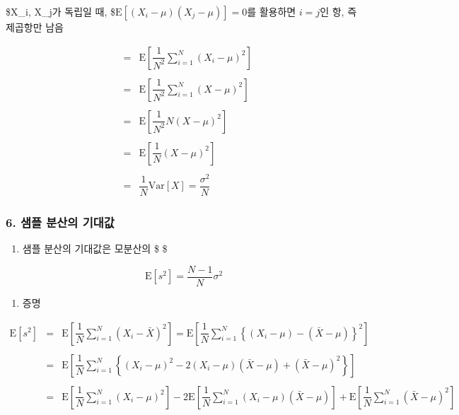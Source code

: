 \documentclass[11pt]{article}
\providecommand{\tightlist}{%
      \setlength{\itemsep}{0pt}\setlength{\parskip}{0pt}}
\begin{document}
    \$X\_i, X\_j가 독립일 때,
\$\(\text{E}\left[ (X_i-\mu)(X_j-\mu) \right] = 0\)를 활용하면 \(i=j\)인
항, 즉 제곱항만 남음

    \[ 
\begin{eqnarray}
&=& \text{E} \left[ \dfrac{1}{N^2} \sum_{i=1}^N (X_i - \mu)^2 \right] \\\\
&=& \text{E} \left[ \dfrac{1}{N^2} \sum_{i=1}^N (X - \mu)^2 \right] \\\\
&=& \text{E} \left[ \dfrac{1}{N^2} N (X - \mu)^2 \right] \\\\
&=& \text{E} \left[ \dfrac{1}{N} (X - \mu)^2 \right] \\\\
&=& \dfrac{1}{N} \text{Var}[X] = \dfrac{\sigma^2}{N}
\end{eqnarray}
\]

    \hypertarget{uxc0d8uxd50c-uxbd84uxc0b0uxc758-uxae30uxb300uxac12}{%
\subsubsection{6. 샘플 분산의
기대값}\label{uxc0d8uxd50c-uxbd84uxc0b0uxc758-uxae30uxb300uxac12}}

    \begin{enumerate}
\def\labelenumi{\arabic{enumi})}
\tightlist
\item
  샘플 분산의 기대값은 모분산의 \$ \$
\end{enumerate}

    \[\text{E}[s^2] = \dfrac{N-1}{N}\sigma^2\]

    \begin{enumerate}
\def\labelenumi{\arabic{enumi})}
\setcounter{enumi}{1}
\tightlist
\item
  증명
\end{enumerate}

    \[ \begin{eqnarray}
\text{E}[s^2] 
&=& \text{E} \left[ \dfrac{1}{N}\sum_{i=1}^N (X_i - \bar{X})^2 \right] 
= \text{E} \left[ \dfrac{1}{N}\sum_{i=1}^N \left\{ (X_i -\mu) - (\bar{X} - \mu) \right \}^2  \right] \\\\
&=& \text{E} \left[ \dfrac{1}{N}\sum_{i=1}^N \left\{ (X_i -\mu)^2 - 2 (X_i -\mu)(\bar{X} - \mu) +  (\bar{X} - \mu)^2 \right \}  \right] \\\\
&=&  \text{E} \left[ \dfrac{1}{N} \sum_{i=1}^N (X_i -\mu)^2 \right] 
  - 2 \text{E} \left[ { \dfrac{1}{N} \sum_{i=1}^N (X_i -\mu)(\bar{X} - \mu) } \right] 
  +  \text{E} \left[ { \dfrac{1}{N} \sum_{i=1}^N (\bar{X} - \mu)^2 } \right] 
\end{eqnarray} \]
\end{document}
